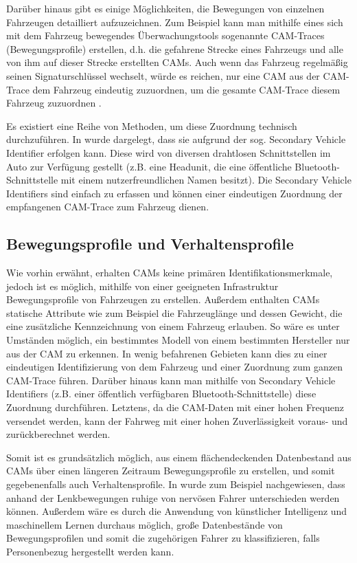 Darüber hinaus gibt es einige Möglichkeiten, die Bewegungen von einzelnen Fahrzeugen detailliert aufzuzeichnen. Zum Beispiel kann man mithilfe eines sich mit dem Fahrzeug bewegendes Überwachungstools sogenannte CAM-Traces (Bewegungsprofile) erstellen, d.h. die gefahrene Strecke eines Fahrzeugs und alle von ihm auf dieser Strecke erstellten CAMs. Auch wenn das Fahrzeug regelmäßig seinen Signaturschlüssel wechselt, würde es reichen, nur eine CAM aus der CAM-Trace dem Fahrzeug eindeutig zuzuordnen, um die gesamte CAM-Trace diesem Fahrzeug zuzuordnen \cite{Kiometzis2017}. 

Es existiert eine Reihe von Methoden, um diese Zuordnung technisch durchzuführen. In \cite{Ullmann2016} wurde dargelegt, dass sie aufgrund der sog. Secondary Vehicle Identifier erfolgen kann. Diese wird von diversen drahtlosen Schnittstellen im Auto zur Verfügung gestellt (z.B. eine Headunit, die eine öffentliche Bluetooth-Schnittstelle mit einem nutzerfreundlichen Namen besitzt). Die Secondary Vehicle Identifiers sind einfach zu erfassen und können einer eindeutigen Zuordnung der empfangenen CAM-Trace zum Fahrzeug dienen. 

\subsection{Bewegungsprofile und Verhaltensprofile}
\label{sec:SecondContentSection:SecondSubsection:FirstSubSubsection}

Wie vorhin erwähnt, erhalten CAMs keine primären Identifikationsmerkmale, jedoch ist es möglich, mithilfe von einer geeigneten Infrastruktur Bewegungsprofile von Fahrzeugen zu erstellen. Außerdem enthalten CAMs statische Attribute wie zum Beispiel die Fahrzeuglänge und dessen Gewicht, die eine zusätzliche Kennzeichnung von einem Fahrzeug erlauben. So wäre es unter Umständen möglich, ein bestimmtes Modell von einem bestimmten Hersteller nur aus der CAM zu erkennen. In wenig befahrenen Gebieten kann dies zu einer eindeutigen Identifizierung von dem Fahrzeug und einer Zuordnung zum ganzen CAM-Trace führen. Darüber hinaus kann man mithilfe von Secondary Vehicle Identifiers (z.B. einer öffentlich verfügbaren Bluetooth-Schnittstelle) diese Zuordnung durchführen. Letztens, da die CAM-Daten mit einer hohen Frequenz versendet werden, kann der Fahrweg mit einer hohen Zuverlässigkeit voraus- und zurückberechnet werden. 

Somit ist es grundsätzlich möglich, aus einem flächendeckenden Datenbestand aus CAMs über einen längeren Zeitraum Bewegungsprofile zu erstellen, und somit gegebenenfalls auch Verhaltensprofile. In \cite{Dettki2005} wurde zum Beispiel nachgewiesen, dass anhand der Lenkbewegungen ruhige von nervösen Fahrer unterschieden werden können. Außerdem wäre es durch die Anwendung von künstlicher Intelligenz und maschinellem Lernen durchaus möglich, große Datenbestände von Bewegungsprofilen und somit die zugehörigen Fahrer zu klassifizieren, falls Personenbezug hergestellt werden kann. 

